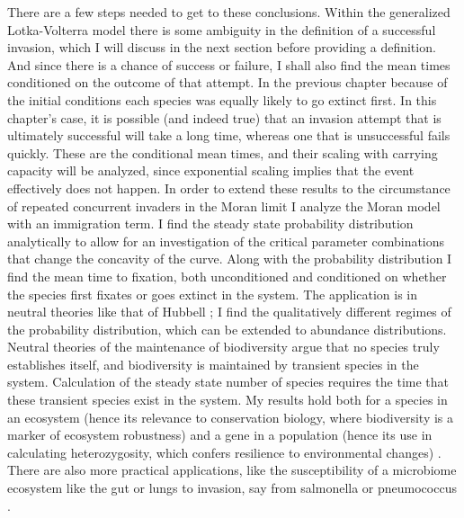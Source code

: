 There are a few steps needed to get to these conclusions. 
Within the generalized Lotka-Volterra model there is some ambiguity in the definition of a successful invasion, which I will discuss in the next section before providing a definition. 
And since there is a chance of success or failure, I shall also find the mean times conditioned on the outcome of that attempt. 
In the previous chapter because of the initial conditions each species was equally likely to go extinct first. 
In this chapter's case, it is possible (and indeed true) that an invasion attempt that is ultimately successful will take a long time, whereas one that is unsuccessful fails quickly. 
These are the conditional mean times, and their scaling with carrying capacity will be analyzed, since exponential scaling implies that the event effectively does not happen. 
In order to extend these results to the circumstance of repeated concurrent invaders in the Moran limit I analyze the Moran model with an immigration term. 
I find the steady state probability distribution analytically to allow for an investigation of the critical parameter combinations that change the concavity of the curve. 
Along with the probability distribution I find the mean time to fixation, both unconditioned and conditioned on whether the species first fixates or goes extinct in the system. 
The application is in neutral theories like that of Hubbell \cite{Hubbell2001}; I find the qualitatively different regimes of the probability distribution, which can be extended to abundance distributions. 
Neutral theories of the maintenance of biodiversity argue that no species truly establishes itself, and biodiversity is maintained by transient species in the system. 
Calculation of the steady state number of species requires the time that these transient species exist in the system. 
My results hold both for a species in an ecosystem (hence its relevance to conservation biology, where biodiversity is a marker of ecosystem robustness) \cite{Peterson1997,McKane2003,Green2005,Bickford2007} and a gene in a population (hence its use in calculating heterozygosity, which confers resilience to environmental changes) \cite{Kimura1971,Kawecki2004,Korolev2011,Pennings2014}. 
There are also more practical applications, like the susceptibility of a microbiome ecosystem like the gut or lungs to invasion, say from salmonella or pneumococcus \cite{Kinross2011,Koenig2011,Roeselers2011,Fisher2014a,Theriot2014,Corander2017,Amor2019}. 

